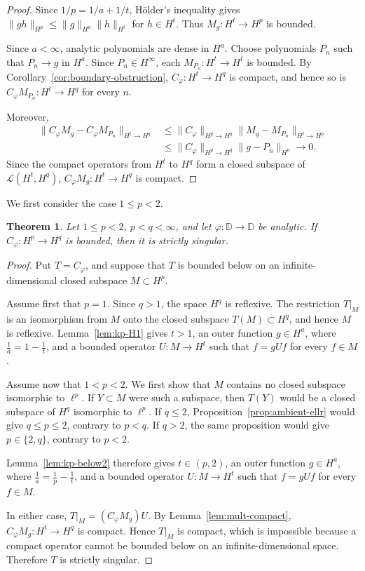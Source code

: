\documentclass[10pt,a4paper]{amsart}
\newtheorem{theorem}{Theorem}[section]
\newcommand{\D}{\mathbb{D}}
\begin{document}
\begin{proof}
Since \(1/p=1/a+1/t\), H\"older's inequality gives
\(\|gh\|_{H^p}\le\|g\|_{H^a}\|h\|_{H^t}\) for \(h\in H^t\).
Thus \(M_g:H^t\to H^p\) is bounded.


Since \(a<\infty\), analytic polynomials are dense in \(H^a\).
Choose polynomials \(P_n\) such that \(P_n\to g\) in \(H^a\).
Since \(P_n\in H^\infty\), each
\(M_{P_n}:H^t\to H^t\) is bounded. By
Corollary~\ref{cor:boundary-obstruction},
\(C_\varphi:H^t\to H^q\) is compact, and hence so is
\(C_\varphi M_{P_n}:H^t\to H^q\) for every \(n\).

Moreover,
\[
\begin{aligned}
\|C_\varphi M_g-C_\varphi M_{P_n}\|_{H^t\to H^q}
&\le
\|C_\varphi\|_{H^p\to H^q}
\|M_g-M_{P_n}\|_{H^t\to H^p}\\
&\le
\|C_\varphi\|_{H^p\to H^q}
\|g-P_n\|_{H^a}
\longrightarrow0.
\end{aligned}
\]
Since the compact operators from \(H^t\) to \(H^q\) form a
closed subspace of \(\mathcal L(H^t,H^q)\),
\(C_\varphi M_g:H^t\to H^q\) is compact.
\end{proof}

We first consider the case \(1\le p<2\).

\begin{theorem}
\label{thm:ss-below2}
Let \(1\le p<2\), \(p<q<\infty\), and let
\(\varphi:\D\to\D\) be analytic. If
\(C_\varphi:H^p\to H^q\) is bounded, then it is strictly singular.
\end{theorem}

\begin{proof}
Put \(T=C_\varphi\), and suppose that \(T\) is bounded below on an
infinite-dimensional closed subspace \(M\subset H^p\).

Assume first that \(p=1\). Since \(q>1\), the space \(H^q\) is
reflexive. The restriction \(T|_M\) is an isomorphism from \(M\) onto
the closed subspace \(T(M)\subset H^q\), and hence \(M\) is reflexive.
Lemma~\ref{lem:kp-H1} gives \(t>1\), an outer
function \(g\in H^a\), where \(\frac1 a=1-\frac 1 t\), and a bounded operator
\(U:M\to H^t\) such that \(f=gUf\) for every \(f\in M\).

Assume now that \(1<p<2\). We first show that \(M\) contains no closed
subspace isomorphic to \(\ell^p\). If \(Y\subset M\) were such a
subspace, then \(T(Y)\) would be a closed subspace of \(H^q\)
isomorphic to \(\ell^p\). If \(q\le2\),
Proposition~\ref{prop:ambient-ellr} would give \(q\le p\le2\),
contrary to \(p<q\). If \(q>2\), the same proposition would give
\(p\in\{2,q\}\), contrary to \(p<2\).

Lemma~\ref{lem:kp-below2} therefore gives
\(t\in(p,2)\), an outer function \(g\in H^a\), where
\(\frac1 a=\frac1 p-\frac1 t\), and a bounded operator \(U:M\to H^t\) such that
\(f=gUf\) for every \(f\in M\).

In either case,
\(T|_M=(C_\varphi M_g)U.
\)
By Lemma~\ref{lem:mult-compact},
\(C_\varphi M_g:H^t\to H^q\) is compact. Hence \(T|_M\) is compact,
which is impossible because a compact operator cannot be bounded
below on an infinite-dimensional space. Therefore \(T\) is strictly
singular.
\end{proof}
\end{document}
